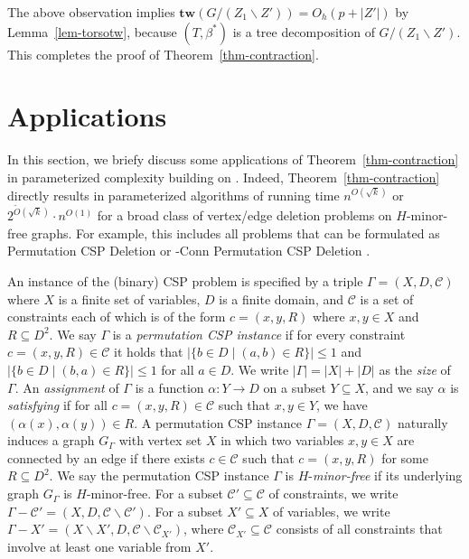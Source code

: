 \documentclass[a4paper,11pt]{article}
\numberwithin{lemma}{section}
\newcommand{\tw}{\mathbf{tw}}
\begin{document}
The above observation implies $\tw(G/(Z_1 \backslash Z')) = O_h(p+|Z'|)$ by Lemma~\ref{lem-torsotw}, because $(T,\beta^*)$ is a tree decomposition of $G/(Z_1 \backslash Z')$.
This completes the proof of Theorem~\ref{thm-contraction}.
 

\section{Applications}
\label{sec-app}

In this section, we briefy discuss some applications of Theorem~\ref{thm-contraction} in parameterized complexity building on \cite{BandyapadhyayLLSJ22,MarxMNT22}.
Indeed, Theorem~\ref{thm-contraction} directly results in parameterized algorithms of running time $n^{O(\sqrt{k})}$ or $2^{\widetilde{O}(\sqrt{k})} \cdot n^{O(1)}$ for a broad class of vertex/edge deletion problems on $H$-minor-free graphs.
For example, this includes all problems that can be formulated as {\sc Permutation CSP Deletion} or {-Conn Permutation CSP Deletion} \cite{MarxMNT22}.

An instance of the (binary) CSP problem is specified by a triple $\varGamma = (X,D,\mathcal{C})$ where $X$ is a finite set of variables, $D$ is a finite domain, and $\mathcal{C}$ is a set of constraints each of which is of the form $c = (x,y,R)$ where $x,y \in X$ and $R \subseteq D^2$.
We say $\varGamma$ is a \emph{permutation CSP instance} if for every constraint $c = (x,y,R) \in \mathcal{C}$ it holds that $|\{b \in D \mid (a,b) \in R\}| \leq 1$ and $|\{b \in D \mid (b,a) \in R\}| \leq 1$ for all $a \in D$.
We write $|\varGamma| = |X| + |D|$ as the \emph{size} of $\varGamma$.
An \emph{assignment} of $\varGamma$ is a function $\alpha: Y \rightarrow D$ on a subset $Y \subseteq X$, and we say $\alpha$ is \emph{satisfying} if for all $c = (x,y,R) \in \mathcal{C}$ such that $x,y \in Y$, we have $(\alpha(x),\alpha(y)) \in R$.
A permutation CSP instance $\varGamma = (X,D,\mathcal{C})$ naturally induces a graph $G_\varGamma$ with vertex set $X$ in which two variables $x,y \in X$ are connected by an edge if there exists $c \in \mathcal{C}$ such that $c = (x,y,R)$ for some $R \subseteq D^2$.
We say the permutation CSP instance $\varGamma$ is $H$-\emph{minor-free} if its underlying graph $G_\varGamma$ is $H$-minor-free.
For a subset $\mathcal{C}' \subseteq \mathcal{C}$ of constraints, we write $\varGamma - \mathcal{C}' = (X,D,\mathcal{C} \backslash \mathcal{C}')$.
For a subset $X' \subseteq X$ of variables, we write $\varGamma - X' = (X \backslash X',D,\mathcal{C} \backslash \mathcal{C}_{X'})$, where $\mathcal{C}_{X'} \subseteq \mathcal{C}$ consists of all constraints that involve at least one variable from $X'$.
\end{document}
